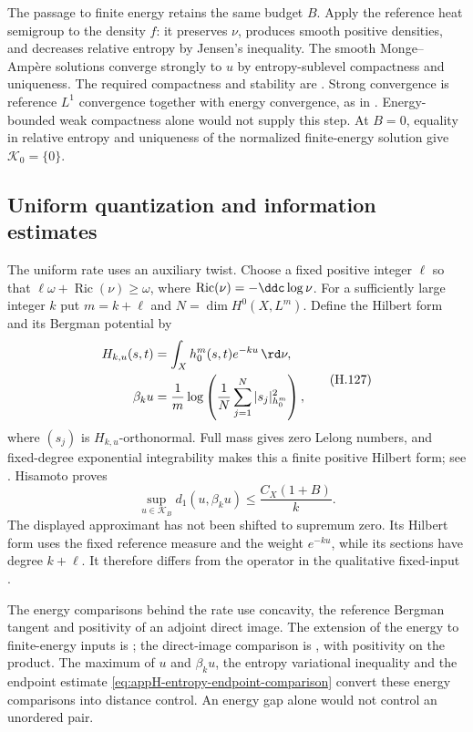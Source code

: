 The passage to finite energy retains the same budget $B$. Apply the
reference heat semigroup to the density $f$: it preserves $\nu$,
produces smooth positive densities, and decreases relative entropy by
Jensen's inequality. The smooth Monge--Amp\`ere solutions converge
strongly to $u$ by entropy-sublevel compactness and uniqueness. The
required compactness and stability are
\cite[Theorem~2.17 and Corollary~2.19]{BBEGZ16TameAuthor}.
Strong convergence is reference $L^1$ convergence together with
energy convergence, as in
\cite[Theorem~3.46 and Proposition~3.52]{Darvas21GeometrySurveyV2}.
Energy-bounded weak compactness alone would not supply this step.
At $B=0$, equality in relative entropy and uniqueness of the
normalized finite-energy solution give $\mathcal K_0=\{0\}$.

\subsection{Uniform quantization and information estimates}

The uniform rate uses an auxiliary twist. Choose a fixed positive
integer $\ell$ so that
$\ell\omega+\operatorname{Ric}(\nu)\geq\omega$, where
$\operatorname{Ric}(\nu)=-\ddc\log\nu$. For a sufficiently large
integer $k$ put $m=k+\ell$ and $N=\dim H^0(X,L^m)$. Define the
Hilbert form and its Bergman potential by
\[
 \begin{aligned}
 H_{k,u}(s,t)&=\int_X h_0^m(s,t)e^{-ku}\,\rd\nu,\\
 \beta_ku&=\frac1m\log\left(\frac1N
            \sum_{j=1}^N|s_j|_{h_0^m}^2\right),
 \end{aligned}
 \tag{H.127}\label{eq:appH-entropy-auxiliary-Bergman}
\]
where $(s_j)$ is $H_{k,u}$-orthonormal. Full mass gives zero Lelong
numbers, and fixed-degree exponential integrability makes this a
finite positive Hilbert form; see
\cite[Lemma~6.4]{BBGZ09VariationalV1}. Hisamoto
\cite[Proposition~5.3]{Hisamoto26MetricEntropyV1} proves
\[
             \sup_{u\in\mathcal K_B}d_1(u,\beta_ku)
                      \leq \frac{C_X(1+B)}k.
\]
The displayed approximant has not been shifted to supremum zero.
Its Hilbert form uses the fixed reference measure and the weight
$e^{-ku}$, while its sections have degree $k+\ell$. It therefore
differs from the operator in the qualitative fixed-input
\cite[Theorem~4.1]{DLR18QuantizationV1}.

The energy comparisons behind the rate use concavity, the
reference Bergman tangent and positivity of an adjoint direct image.
The extension of the energy to finite-energy inputs is
\cite[Propositions~2.1 and 2.4]{BBGZ09VariationalV1}; the direct-image
comparison is \cite[Proposition~2.12]{DLR18QuantizationV1}, with
positivity on the product. The maximum of $u$ and $\beta_ku$, the
entropy variational inequality and the endpoint estimate
\eqref{eq:appH-entropy-endpoint-comparison} convert these energy
comparisons into distance control. An energy gap alone would not
control an unordered pair.

